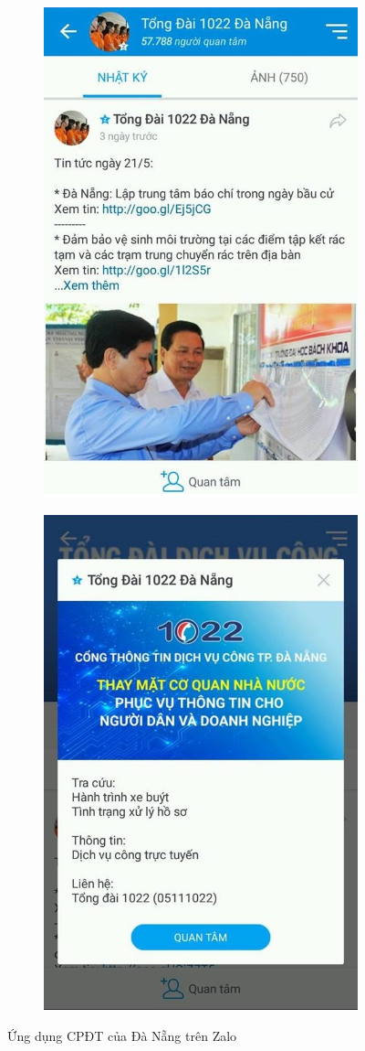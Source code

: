 \documentclass[a4paper]{article}
\begin{document}
\newpage
\begin{figure}[h]
\centering
\begin{subfigure}{.5\textwidth}
  \centering
  \includegraphics[width=0.7\linewidth]{zalo-danang-1.jpg}
  \caption{}
\end{subfigure}%
\begin{subfigure}{.5\textwidth}
  \centering
  \includegraphics[width=0.7\linewidth]{zalo-danang-2.jpg}
  \caption{}
  \label{fig:sub2}
\end{subfigure}
\caption{Ứng dụng CPĐT của Đà Nẵng trên Zalo}
\end{figure}
\end{document}

